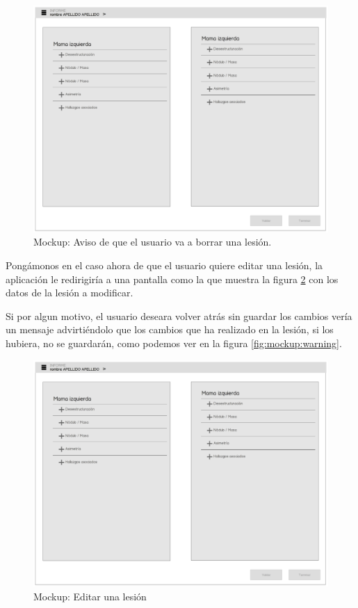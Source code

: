 \begin{figure}[ht]
\centering
\includegraphics[page=8,scale=0.4]{./imgs/mockup/mockup.pdf}
\caption{Mockup: Aviso de que el usuario va a borrar una lesión.}
\label{fig:mockup:delete}
\end{figure}

Pongámonos en el caso ahora de que el usuario quiere editar una lesión, la aplicación le redirigiría a una pantalla como la que muestra la figura \ref{fig:mockup:edit} con los datos de la lesión a modificar.\par
Si por algun motivo, el usuario deseara volver atrás sin guardar los cambios vería un mensaje advirtiéndolo que los cambios que ha realizado en la lesión, si los hubiera, no se guardarán, como podemos ver en la figura \ref{fig:mockup:warning}.\par
\begin{figure}[ht]
\centering
\includegraphics[page=10,scale=0.4]{./imgs/mockup/mockup.pdf}
\caption{Mockup: Editar una lesión}
\label{fig:mockup:edit}
\end{figure}


